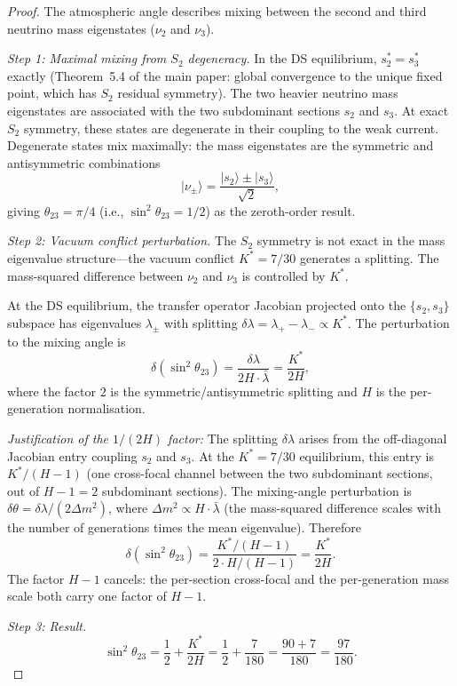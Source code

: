 \documentclass[11pt,a4paper]{article}
\theoremstyle{definition}
\theoremstyle{remark}
\begin{document}
\begin{proof}
The atmospheric angle describes mixing between the second and third neutrino mass eigenstates ($\nu_2$ and $\nu_3$).

\emph{Step 1: Maximal mixing from $S_2$ degeneracy.}
In the DS equilibrium, $s_2^* = s_3^*$ exactly (Theorem~5.4 of the main paper: global convergence to the unique fixed point, which has $S_2$ residual symmetry). The two heavier neutrino mass eigenstates are associated with the two subdominant sections $s_2$ and $s_3$. At exact $S_2$ symmetry, these states are degenerate in their coupling to the weak current. Degenerate states mix maximally: the mass eigenstates are the symmetric and antisymmetric combinations
\[
|\nu_\pm\rangle = \frac{|s_2\rangle \pm |s_3\rangle}{\sqrt{2}},
\]
giving $\theta_{23} = \pi/4$ (i.e., $\sin^2\theta_{23} = 1/2$) as the zeroth-order result.

\emph{Step 2: Vacuum conflict perturbation.}
The $S_2$ symmetry is not exact in the mass eigenvalue structure---the vacuum conflict $K^* = 7/30$ generates a splitting. The mass-squared difference between $\nu_2$ and $\nu_3$ is controlled by $K^*$.

At the DS equilibrium, the transfer operator Jacobian projected onto the $\{s_2, s_3\}$ subspace has eigenvalues $\lambda_\pm$ with splitting $\delta\lambda = \lambda_+ - \lambda_- \propto K^*$. The perturbation to the mixing angle is
\begin{equation}\label{eq:theta23_perturbation}
\delta(\sin^2\theta_{23}) = \frac{\delta\lambda}{2H \cdot \bar{\lambda}} = \frac{K^*}{2H},
\end{equation}
where the factor $2$ is the symmetric/antisymmetric splitting and $H$ is the per-generation normalisation.

\emph{Justification of the $1/(2H)$ factor:}
The splitting $\delta\lambda$ arises from the off-diagonal Jacobian entry coupling $s_2$ and $s_3$. At the $K^* = 7/30$ equilibrium, this entry is $K^*/(H-1)$ (one cross-focal channel between the two subdominant sections, out of $H-1 = 2$ subdominant sections). The mixing-angle perturbation is $\delta\theta = \delta\lambda/(2\Delta m^2)$, where $\Delta m^2 \propto H \cdot \bar{\lambda}$ (the mass-squared difference scales with the number of generations times the mean eigenvalue). Therefore
\[
\delta(\sin^2\theta_{23}) = \frac{K^*/(H-1)}{2 \cdot H/(H-1)} = \frac{K^*}{2H}.
\]
The factor $H-1$ cancels: the per-section cross-focal and the per-generation mass scale both carry one factor of $H-1$.

\emph{Step 3: Result.}
\[
\sin^2\theta_{23} = \frac{1}{2} + \frac{K^*}{2H} = \frac{1}{2} + \frac{7}{180} = \frac{90 + 7}{180} = \frac{97}{180}.
\]
\end{proof}
\end{document}
